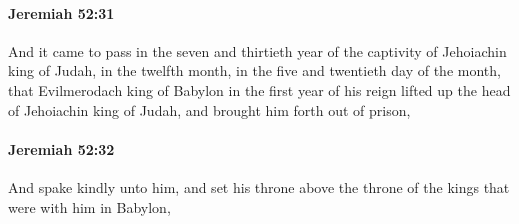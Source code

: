 		\paragraph{Jeremiah 52:31} %
			\label{JEREMIAH-52-31}

			And it came to pass in the seven and thirtieth year of the captivity of Jehoiachin king of Judah, in the twelfth month, in the five and twentieth day of the month, that Evilmerodach king of Babylon in the first year of his reign lifted up the head of Jehoiachin king of Judah, and brought him forth out of prison,


		\paragraph{Jeremiah 52:32} %
			\label{JEREMIAH-52-32}

			And spake kindly unto him, and set his throne above the throne of the kings that were with him in Babylon,

